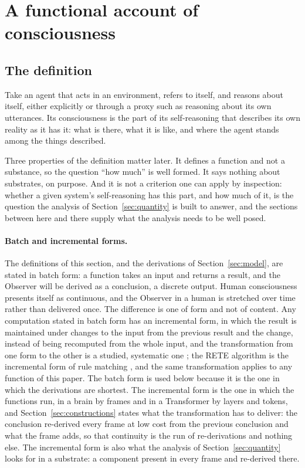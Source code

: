 \section{A functional account of consciousness}
\label{sec:account}
\label{sec:approach}

\subsection{The definition}
\label{sec:definition}

Take an agent that acts in an environment, refers to itself, and reasons about itself, either
explicitly or through a proxy such as reasoning about its own utterances. Its consciousness is the part
of its self-reasoning that describes its own reality as it has it: what is there, what it is like, and
where the agent stands among the things described.

Three properties of the definition matter later. It defines a function and not a substance, so the
question ``how much'' is well formed. It says nothing about substrates, on purpose. And it is not a
criterion one can apply by inspection: whether a given system's self-reasoning has this part, and how
much of it, is the question the analysis of Section~\ref{sec:quantity} is built to answer, and the
sections between here and there supply what the analysis needs to be well posed.

\paragraph{Batch and incremental forms.}
\label{sec:incremental}
The definitions of this section, and the derivations of Section~\ref{sec:model}, are stated in batch
form: a function takes an input and returns a result, and the Observer will be derived as a
conclusion, a discrete output. Human consciousness presents itself as continuous, and the Observer in a
human is stretched over time rather than delivered once. The difference is one of form and not of
content. Any computation stated in batch form has an incremental form, in which the result is
maintained under changes to the input from the previous result and the change, instead of being
recomputed from the whole input, and the transformation from one form to the other is a studied,
systematic one \citep{liu2025}; the RETE algorithm is the incremental form of rule matching
\citep{forgy1982}, and the same transformation applies to any function of this paper. The batch form is
used below because it is the one in which the derivations are shortest. The incremental form is the
one in which the functions run, in a brain by frames and in a Transformer by layers and tokens, and
Section~\ref{sec:constructions} states what the transformation has to deliver: the conclusion
re-derived every frame at low cost from the previous conclusion and what the frame adds, so that
continuity is the run of re-derivations and nothing else. The incremental form is also what the
analysis of Section~\ref{sec:quantity} looks for in a substrate: a component present in every frame
and re-derived there.


